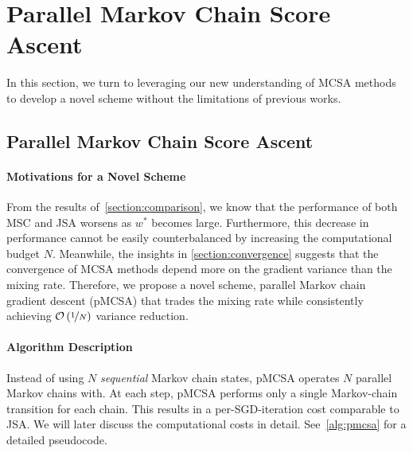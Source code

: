 \vspace{-0.05in}
\section{Parallel Markov Chain Score Ascent}\label{section:pmcsa}
\vspace{-0.05in}
In this section, we turn to leveraging our new understanding of MCSA methods to develop a novel scheme without the limitations of previous works.

\vspace{-0.05in}
\subsection{Parallel Markov Chain Score Ascent}
\vspace{-0.05in}
\paragraph{Motivations for a Novel Scheme}
From the results of~\cref{section:comparison}, we know that the performance of both MSC and JSA worsens as \(w^*\) becomes large.
Furthermore, this decrease in performance cannot be easily counterbalanced by increasing the computational budget \(N\).
Meanwhile, the insights in \cref{section:convergence} suggests that the convergence of MCSA methods depend more on the gradient variance than the mixing rate.
Therefore, we propose a novel scheme, parallel Markov chain gradient descent (pMCSA) that trades the mixing rate while consistently achieving \(\mathcal{O}\left(\nicefrac{1}{N}\right)\) variance reduction.


\vspace{-0.1in}
\paragraph{Algorithm Description}
Instead of using \(N\) \textit{sequential} Markov chain states, pMCSA operates \(N\) parallel Markov chains with.
At each step, pMCSA performs only a single Markov-chain transition for each chain.
This results in a per-SGD-iteration cost comparable to JSA.
We will later discuss the computational costs in detail.
See~\cref{alg:pmcsa} for a detailed pseudocode.

